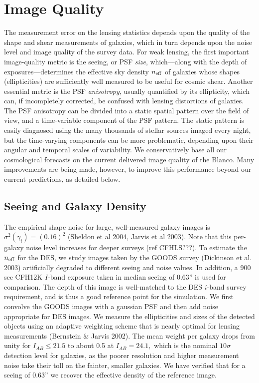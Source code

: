 \documentclass[preprint]{aastex}
\begin{document}
\section{Image Quality}
The measurement error on the lensing statistics depends upon the
quality of the shape and shear measurements of galaxies, which in turn
depends upon the noise level and image quality of the survey data.
For weak lensing, the first important image-quality metric is the
seeing, or PSF {\em size}, which---along with the depth of
  exposures---determines the effective sky density $n_{\rm eff}$ of
  galaxies whose shapes (ellipticities) are sufficiently well measured
  to be useful for cosmic shear.
Another essential metric is the
PSF {\em anisotropy}, usually quantified by its ellipticity, which
  can, if incompletely corrected, be confused with lensing distortions
  of galaxies.  The PSF anisotropy can be divided into a static
  spatial pattern over the field of view, and a time-variable
  component of the PSF pattern.
The static pattern is easily diagnosed using the many thousands of stellar
sources imaged every night, but the time-varying components can be
more problematic, depending upon their angular and temporal scales of
variability. 
We conservatively base all our cosmological forecasts on the current
delivered image quality of the Blanco. Many improvements are being
made, however, to improve this performance beyond
our current predictions, as detailed below.

\subsection{Seeing and Galaxy Density}
The empirical
shape noise for large, well-measured galaxy images is
$\sigma^2(\gamma_i)=(0.16)^2$ (Sheldon et al 2004, Jarvis et al 2003).  Note
that this per-galaxy noise level increases for deeper surveys (ref CFHLS???).
To estimate the $n_{\rm eff}$ for the DES, we study images taken
by the GOODS survey (Dickinson et al. 2003) artificially degraded to different
seeing and noise values.  In addition, a 900 sec CFH12K $I$-band
exposure taken in median seeing of 0.63'' is used for comparison. 
The depth of this image is well-matched to the DES $i$-band
survey requirement, and is thus a good reference point for
the simulation. We first convolve the GOODS images with a gaussian
PSF and then add noise appropriate for DES images.
We measure the ellipticities and sizes of the detected
objects using an adaptive weighting scheme that is nearly optimal for
lensing measurements (Bernstein \& Jarvis 2002). 
The mean weight per galaxy drops from unity
for $I_{AB}\le21.5$ to about 0.5 at $I_{AB}=24.1,$ which is the
nominal $10\sigma$ detection level for galaxies, as the poorer
resolution and higher measurement noise take their toll on the
fainter, smaller galaxies. We have verified that for a seeing
of 0.63'' we recover the effective density of the reference image.
\end{document}
